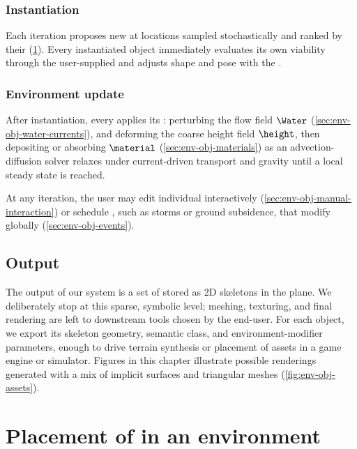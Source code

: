 \subsubsection{Instantiation}

Each iteration proposes new  at locations sampled stochastically and ranked by their  (\cref{sec:env-obj-generation-rules}).
Every instantiated object immediately evaluates its own viability through the user-supplied  and adjusts shape and pose with the .

\subsubsection{Environment update}

After instantiation, every  applies its : perturbing the flow field $\Water$ (\cref{sec:env-obj-water-currents}), and deforming the coarse height field $\height$, then depositing or absorbing  $\material$ (\cref{sec:env-obj-materials}) as an advection-diffusion solver relaxes  under current-driven transport and gravity until a local steady state is reached.

At any iteration, the user may edit individual  interactively (\cref{sec:env-obj-manual-interaction}) or schedule , such as storms or ground subsidence, that modify  globally (\cref{sec:env-obj-events}).

\subsection{Output}

The output of our system is a set of  stored as 2D skeletons in the plane. We deliberately stop at this sparse, symbolic level; meshing, texturing, and final rendering are left to downstream tools chosen by the end-user. For each object, we export its skeleton geometry, semantic class, and environment-modifier parameters, enough to drive terrain synthesis or placement of assets in a game engine or simulator. Figures in this chapter illustrate possible renderings generated with a mix of implicit surfaces and triangular meshes (\cref{fig:env-obj-assets}).


\section{Placement of  in an environment}
\label{sec:env-obj-generation-rules}

